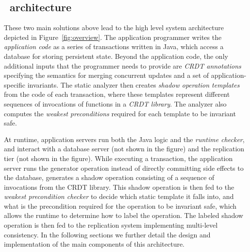 \subsection{\tool\ architecture}
These two main solutions above lead to the high level
system architecture depicted in Figure~\ref{fig:overview}. The application
programmer writes the {\em application code} as a series of transactions
written in Java, which access a database
for storing persistent state. Beyond the application code, the only additional
inputs that the programmer needs to provide are {\em CRDT annotations}
specifying the semantics for merging concurrent updates and 
a set of application-specific invariants.
The static analyzer then 
creates {\em shadow operation templates} from the code of each transaction,
where these templates represent different sequences of invocations of
functions in a {\em CRDT library}. The analyzer also
computes the  {\em weakest preconditions} required for each template
to be invariant safe. 

At runtime, application servers run both the Java logic and 
the {\em runtime checker}, and interact with a database server (not shown in the figure)
and the replication tier (not shown in the figure).
While executing a transaction, the application server runs the
generator operation  instead of
directly committing side effects to the database,  
generates a shadow operation consisting of a sequence of 
invocations from the CRDT library.
This shadow operation is then fed to the {\em weakest
precondition checker} to decide which static template it falls into, 
and what is the precondition required for
the operation to be invariant safe, which allows the runtime to
determine how to label the operation. The labeled shadow operation is then fed to
the replication system implementing multi-level consistency.
In the following sections we further detail the design and implementation
of the main components of this architecture.

